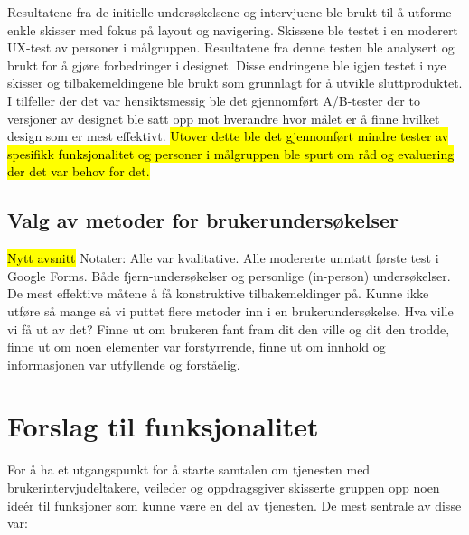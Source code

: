 Resultatene fra de initielle undersøkelsene og intervjuene ble brukt til å utforme enkle skisser med fokus på layout og navigering. Skissene ble testet i en moderert UX-test av personer i målgruppen. Resultatene fra denne testen ble analysert og brukt for å gjøre forbedringer i designet. Disse endringene ble igjen testet i nye skisser og tilbakemeldingene ble brukt som grunnlagt for å utvikle sluttproduktet. I tilfeller der det var hensiktsmessig ble det gjennomført A/B-tester der to versjoner av designet ble satt opp mot hverandre hvor målet er å finne hvilket design som er mest effektivt. \hl{Utover dette ble det gjennomført mindre tester av spesifikk funksjonalitet og personer i målgruppen ble spurt om råd og evaluering der det var behov for det.}

\subsection{Valg av metoder for brukerundersøkelser}
\hl{Nytt avsnitt}
Notater:
Alle var kvalitative.
Alle modererte unntatt første test i Google Forms.
Både fjern-undersøkelser og personlige (in-person) undersøkelser.
De mest effektive måtene å få konstruktive tilbakemeldinger på.
Kunne ikke utføre så mange så vi puttet flere metoder inn i en brukerundersøkelse.
Hva ville vi få ut av det? Finne ut om brukeren fant fram dit den ville og dit den trodde, finne ut om noen elementer var forstyrrende, finne ut om innhold og informasjonen var utfyllende og forståelig.

\section{Forslag til funksjonalitet}
\label{section:funkForslag}
For å ha et utgangspunkt for å starte samtalen om tjenesten med brukerintervjudeltakere, veileder og oppdragsgiver skisserte gruppen opp noen ideér til funksjoner som kunne være en del av tjenesten. De mest sentrale av disse var:\newline

